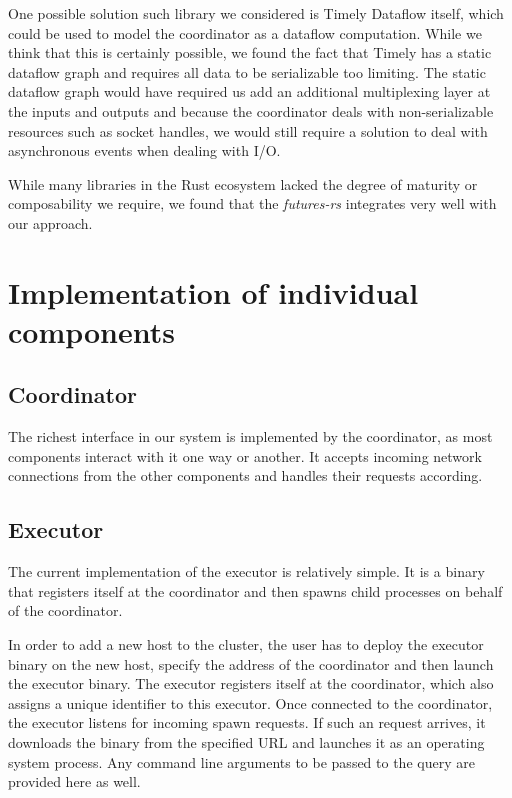 One possible solution such library we considered is Timely Dataflow itself, which could
be used to model the coordinator as a dataflow computation.
While we think that this is certainly possible, we found the fact that Timely
has a static dataflow graph and requires all data to be serializable too limiting.
The static dataflow graph would have required us add an additional multiplexing
layer at the inputs and outputs and because the coordinator deals with non-serializable
resources such as socket handles, we would still require a solution to deal with
asynchronous events when dealing with I/O.

While many libraries in the Rust ecosystem lacked the degree of maturity
or composability we require, we found that the \emph{futures-rs} integrates
very well with our approach. 

\section{Implementation of individual components}

\subsection{Coordinator}

The richest interface in our system is implemented by the coordinator, as most
components interact with it one way or another. It accepts incoming network
connections from the other components and handles their requests according.



\subsection{Executor}

The current implementation of the executor is relatively simple. It is a binary
that registers itself at the coordinator and then spawns child processes on behalf
of the coordinator.

In order to add a new host to the cluster, the user has to deploy the executor
binary on the new host, specify the address of the coordinator and then launch
the executor binary. The executor registers itself at the coordinator, which
also assigns a unique identifier to this executor. Once connected to the
coordinator, the executor listens for incoming spawn requests. If such an
request arrives, it downloads the binary from the specified URL and launches
it as an operating system process. Any command line arguments to be passed
to the query are provided here as well.

